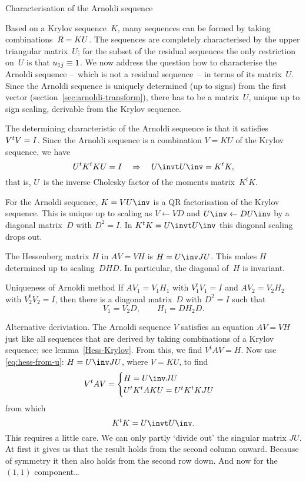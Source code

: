 \documentclass[11pt]{artikel3}
\begin{document}
\begin{Outline}
 {Characterisation of the Arnoldi sequence}

Based on a Krylov sequence~$K$, many sequences can be formed by taking
combinations~$R=\nobreak KU$.  The sequences are completely characterised by
the upper triangular matrix~$U$; for the subset of the residual
sequences the only restriction on~$U$ is that $u_{1j}\equiv\nobreak1$.
We now address the question how to characterise the Arnoldi sequence
--~which is not a residual sequence~--
in terms of its matrix~$U$.  Since the Arnoldi sequence is uniquely
determined (up to signs) from the first vector
(section~\ref{sec:arnoldi-transform}), there has to be a matrix~$U$,
unique up to sign scaling, derivable from the Krylov
sequence.

The determining characteristic of the Arnoldi sequence is that it
satisfies $V^tV=\nobreak I$. 
Since the Arnoldi sequence is a combination $V=KU$ of the Krylov sequence,
we have \[ U^tK^tKU=I\quad\Rightarrow\quad U\invt U\inv=K^tK, \]
that is, $U$~is the inverse Cholesky factor of the moments matrix~$K^tK$.

For the Arnoldi sequence, $K=VU\inv$ is a QR factorisation of the 
Krylov sequence.  This is unique up to scaling as $V\leftarrow VD$
and $U\inv\leftarrow DU\inv$ by a diagonal matrix~$D$ with $D^2=I$.
In $K^tK=U\invt U\inv$ this diagonal scaling drops out.

The Hessenberg matrix $H$ in $AV=VH$ is $H=U\inv JU$.
This makes $H$ determined up to scaling~$DHD$.
In particular, the diagonal of~$H$ is invariant.

\begin{llemma}{Uniqueness of Arnoldi method}
If $AV_1=V_1H_1$ with $V_1^tV_1=I$ and $AV_2=V_2H_2$ with $V_2^tV_2=I$,
then there is a diagonal matrix~$D$ with $D^2=I$ such that
\[ V_1=V_2D,\qquad H_1=DH_2D. \]
\end{llemma}

Alternative deriviation.
The Arnoldi sequence $V$ satisfies an equation $AV=VH$ just like all
sequences that are derived by taking combinations of a Krylov sequence;
see lemma~\ref{Hess-Krylov}.
From this, we find $V^tAV=H$. Now use \eqref{eq:hess-from-u}: $H=U\inv JU$,
where $V=KU$, to find
\[ V^tAV=\begin{cases}H=U\inv JU\cr U^tK^tAKU=U^tK^tKJU\cr\end{cases} \]
from which
\[ K^tK=U\invt U\inv. \]
This requires a little care. We can only partly `divide out' the
singular matrix $JU$. At first it gives us that the result holds from
the second column onward. Because of symmetry it then also holds from
the second row down. And now for the $(1,1)$ component\dots


\end{Outline}
\end{document}

